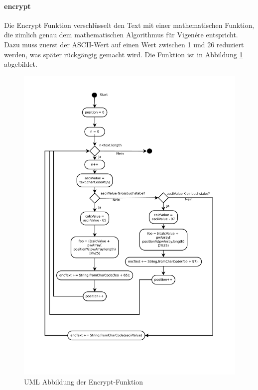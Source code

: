 \documentclass[11pt,paper=a4,final]{scrartcl}
\begin{document}
\paragraph{encrypt}
Die Encrypt Funktion verschl\"usselt den Text mit einer mathematischen Funktion,
die zimlich genau dem mathematischen Algorithmus f\"ur Vigen\'ere entspricht.
Dazu muss zuerst der ASCII-Wert auf einen Wert zwischen 1 und 26 reduziert
werden, was sp\"ater r\"uckg\"angig gemacht wird. Die Funktion ist in
Abbildung \ref{fig:encrypt} \glqq {}\grqq abgebildet.
\begin{figure}[h!]
  \centering
  \includegraphics[width=\textwidth]{encrypt.pdf}
  \caption{UML Abbildung der Encrypt-Funktion}
  \label{fig:encrypt}
\end{figure}
\end{document}
